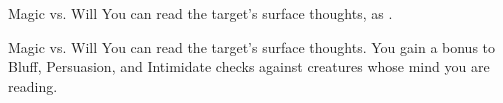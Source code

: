 \begin{spellheader}
    \spellrng{\rngmed}
\end{spellheader}
\begin{spelleffects}
    \begin{spellattack}{Magic vs. Will}
        \spelleffect You can read the target's surface thoughts, as .
    \end{spellattack}
\end{spelleffects}
\begin{spellfooter}

\end{spellfooter}

\begin{spellheader}
\end{spellheader}
\begin{spelleffects}
    \begin{spellattack}{Magic vs. Will}
        \spellsuccess You can read the target's surface thoughts. You gain a  bonus to Bluff, Persuasion, and Intimidate checks against creatures whose mind you are reading.
    \end{spellattack}
\end{spelleffects}
\begin{spellfooter}

\end{spellfooter}

